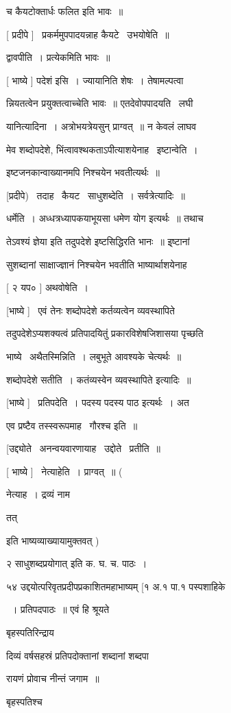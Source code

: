 \documentclass[11pt, openany]{book}
\begin{document}
च कैयटोक्तार्धः फलित इति भावः~॥ 

[ प्रदीपे ] \textendash\ प्रकर्ममुपपादयन्नाह कैयटे \textendash\ उभयोषेति~॥ 

द्वावपीति~। प्रत्येकमिति भावः~॥ 

[ भाष्ये ] पदेशं इसि~। ज्यायानिति शेषः~। तेषामल्पत्वा \textendash\ 

न्नियतत्वेन प्रयुक्तत्वाच्चेति भावः~॥ एतदेवोपपादयति \textendash\ लघी \textendash\ 

यानित्यादिना~। अत्रोभयत्रेयसुन् प्राग्वत्~॥ न केवलं लाघव \textendash\ 

मेव शब्दोपदेशे, भिंत्वावश्थकताऽपीत्याशयेनाह \textendash\ इष्टान्वेति~। 

इष्टजनकान्वाख्यानमपि निश्चयेन भवतीत्यर्थः~॥ 

[प्रदीपे) \textendash\ तदाह \textendash\ कैयट \textendash\ साधुशब्देति~। सर्वत्रेत्यादिः~॥ 

धर्मेति~। अध्धत्रध्यापकयाभूयसा धमेण योग इत्यर्थः~॥ तथाच 

तेऽवश्यं ज्ञेया इति तदुपदेशे इष्टसिद्धिरति भानः~॥ इ्ष्टानां 

सुशब्दानां साक्षाज्ज्ञानं निश्चयेन भवतीति भाष्यार्थाशयेनाह \textendash\ 

[ २ यप० ] अथवोषेति~। 

[भाष्ये ] \textendash\ एवं तेनः शब्दोपदेशे कर्तव्यत्वेन व्यवस्थापिते 

तदुपदेशेऽप्यशक्यत्वं प्रतिपादयितुं प्रकारविशेषजिशासया पृच्छति \textendash\ 

भाष्ये \textendash\ अथैतस्मिन्निति~। लबुभूते आवश्यके चेत्यर्थः~॥ 

शब्दोपदेशे सतीति~। कतंव्यस्वेन व्यवस्थापिते इत्यादिः~॥ 

[भाष्ये ] \textendash\ प्रतिपदेति~। पदस्य पदस्य पाठ इत्यर्थः~। अत 

एव प्रष्टैव तस्स्वरूपमाह \textendash\ गौरश्च इति~॥ 

[उद्द्योते \textendash\ अनन्वयवारणायाह \textendash\ उद्दोते \textendash\ प्रतीति~॥ 

[ भाष्ये ] \textendash\ नेत्याहेति~। प्राग्वत्~॥ ({\qt नेत्याह~। द्रव्यं नाम 

तत्} इति भाष्यव्याख्यायामुक्तवत् ) 

२ {\qt साधुशब्दप्रयोगात्} इति क. घ. च. पाठः~। 

५४ उद्दयोत्परिवृतप्रदीपप्रकाशितमहाभाष्यम् [१ अ.१ पा.१ पस्पशाहिके 

~। प्रतिपदपाठः~॥ एवं हि श्रूयते \textendash\ {\qt बृहस्पतिरिन्द्राय 

दिव्यं वर्षसहस्रं प्रतिपदोक्तानां शब्दानां शब्दपा \textendash\ 

रायणं प्रोवाच नीन्तं जगाम~॥} बृहस्पतिश्च
\end{document}
